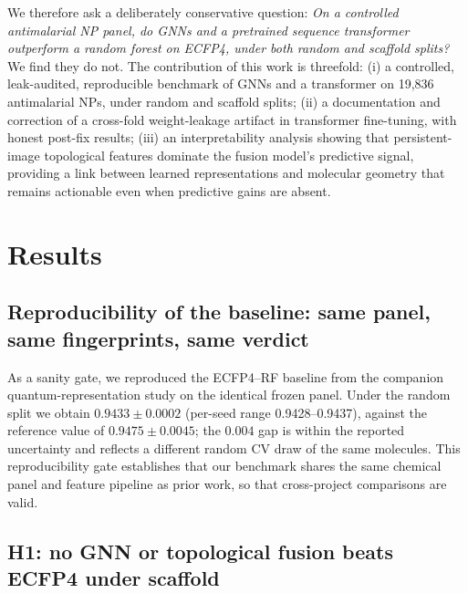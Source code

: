 \documentclass[11pt,a4paper]{article}
\begin{document}
We therefore ask a deliberately conservative question: \emph{On a controlled antimalarial NP panel, do GNNs and a pretrained sequence transformer outperform a random forest on ECFP4, under both random and scaffold splits?} We find they do not. The contribution of this work is threefold: (i) a controlled, leak-audited, reproducible benchmark of GNNs and a transformer on 19,836 antimalarial NPs, under random and scaffold splits; (ii) a documentation and correction of a cross-fold weight-leakage artifact in transformer fine-tuning, with honest post-fix results; (iii) an interpretability analysis showing that persistent-image topological features dominate the fusion model's predictive signal, providing a link between learned representations and molecular geometry that remains actionable even when predictive gains are absent.

\section{Results}

\subsection{Reproducibility of the baseline: same panel, same fingerprints, same verdict}

As a sanity gate, we reproduced the ECFP4--RF baseline from the companion quantum-representation study \citep{temgoua2027quantum} on the identical frozen panel. Under the random split we obtain $0.9433 \pm 0.0002$ (per-seed range 0.9428--0.9437), against the reference value of $0.9475 \pm 0.0045$; the $0.004$ gap is within the reported uncertainty and reflects a different random CV draw of the same molecules. This reproducibility gate establishes that our benchmark shares the same chemical panel and feature pipeline as prior work, so that cross-project comparisons are valid.

\subsection{H1: no GNN or topological fusion beats ECFP4 under scaffold}
\end{document}
